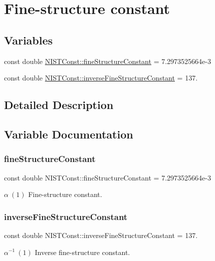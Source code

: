 \hypertarget{group___n_i_s_t_const-_fine_structure_constant}{}\section{Fine-\/structure constant}
\label{group___n_i_s_t_const-_fine_structure_constant}
\subsection*{Variables}
\begin{DoxyCompactItemize}
\item 
const double \mbox{\hyperlink{group___n_i_s_t_const-_fine_structure_constant_ga0f1ddaca2627b7253ed177aa1b074724}{N\+I\+S\+T\+Const\+::fine\+Structure\+Constant}} = 7.\+2973525664e-\/3
\item 
const double \mbox{\hyperlink{group___n_i_s_t_const-_fine_structure_constant_gaa4cd257f5376577cf0331e71dd952bb6}{N\+I\+S\+T\+Const\+::inverse\+Fine\+Structure\+Constant}} = 137.
\end{DoxyCompactItemize}


\subsection{Detailed Description}


\subsection{Variable Documentation}
\mbox{\label{group___n_i_s_t_const-_fine_structure_constant_ga0f1ddaca2627b7253ed177aa1b074724}} 
\subsubsection{\texorpdfstring{fine\+Structure\+Constant}{fineStructureConstant}}
{\footnotesize\ttfamily const double N\+I\+S\+T\+Const\+::fine\+Structure\+Constant = 7.\+2973525664e-\/3}

$\alpha \ (1)$ Fine-\/structure constant. \mbox{\label{group___n_i_s_t_const-_fine_structure_constant_gaa4cd257f5376577cf0331e71dd952bb6}} 
\subsubsection{\texorpdfstring{inverse\+Fine\+Structure\+Constant}{inverseFineStructureConstant}}
{\footnotesize\ttfamily const double N\+I\+S\+T\+Const\+::inverse\+Fine\+Structure\+Constant = 137.}

$\alpha^{-1} \ (1)$ Inverse fine-\/structure constant. 